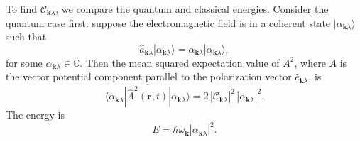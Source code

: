 \documentclass[pra,12pt]{revtex4}
\begin{document}
To find $\mathcal{C}_{\mathbf{k}\lambda}$, we compare the quantum and
classical energies.  Consider the quantum case first: suppose the
electromagnetic field is in a coherent state
$|\alpha_{\mathbf{k}\lambda}\rangle$ such that
\begin{equation}
  \hat{a}_{\mathbf{k}\lambda}|\alpha_{\mathbf{k}\lambda}\rangle
  = \alpha_{\mathbf{k}\lambda}|\alpha_{\mathbf{k}\lambda}\rangle,
  \label{coherent}
\end{equation}
for some $\alpha_{\mathbf{k}\lambda} \in \mathbb{C}$.  Then the mean
squared expectation value of $A^2$, where $A$ is the vector potential
component parallel to the polarization vector
$\hat{e}_{\mathbf{k}\lambda}$, is
\begin{equation}
  \overline{\langle \alpha_{\mathbf{k}\lambda} | \hat{A}^2(\mathbf{r},t) | \alpha_{\mathbf{k}\lambda}\rangle}
  = 2 \, |\mathcal{C}_{\mathbf{k}\lambda}|^2 \, |\alpha_{\mathbf{k}\lambda}|^2.
  \label{quant_Asq}
\end{equation}
The energy is
\begin{equation}
  E = \hbar\omega_{\mathbf{k}} |\alpha_{\mathbf{k}\lambda}|^2.
  \label{quant_energy}
\end{equation}
\end{document}
